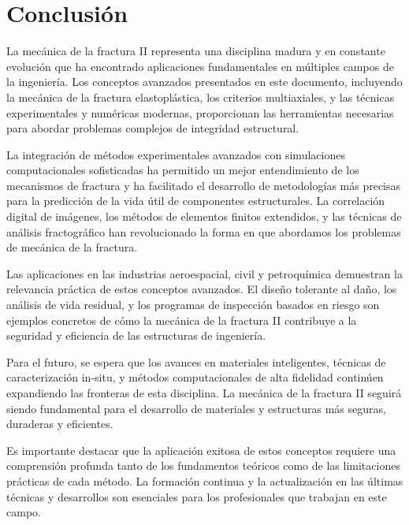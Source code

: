 \documentclass[12pt,letterpaper]{article}
\begin{document}
\section{Conclusión}

La mecánica de la fractura II representa una disciplina madura y en constante evolución que ha encontrado aplicaciones fundamentales en múltiples campos de la ingeniería. Los conceptos avanzados presentados en este documento, incluyendo la mecánica de la fractura elastoplástica, los criterios multiaxiales, y las técnicas experimentales y numéricas modernas, proporcionan las herramientas necesarias para abordar problemas complejos de integridad estructural.

La integración de métodos experimentales avanzados con simulaciones computacionales sofisticadas ha permitido un mejor entendimiento de los mecanismos de fractura y ha facilitado el desarrollo de metodologías más precisas para la predicción de la vida útil de componentes estructurales. La correlación digital de imágenes, los métodos de elementos finitos extendidos, y las técnicas de análisis fractográfico han revolucionado la forma en que abordamos los problemas de mecánica de la fractura.

Las aplicaciones en las industrias aeroespacial, civil y petroquímica demuestran la relevancia práctica de estos conceptos avanzados. El diseño tolerante al daño, los análisis de vida residual, y los programas de inspección basados en riesgo son ejemplos concretos de cómo la mecánica de la fractura II contribuye a la seguridad y eficiencia de las estructuras de ingeniería.

Para el futuro, se espera que los avances en materiales inteligentes, técnicas de caracterización in-situ, y métodos computacionales de alta fidelidad continúen expandiendo las fronteras de esta disciplina. La mecánica de la fractura II seguirá siendo fundamental para el desarrollo de materiales y estructuras más seguras, duraderas y eficientes.

Es importante destacar que la aplicación exitosa de estos conceptos requiere una comprensión profunda tanto de los fundamentos teóricos como de las limitaciones prácticas de cada método. La formación continua y la actualización en las últimas técnicas y desarrollos son esenciales para los profesionales que trabajan en este campo.

\newpage
\printbibliography
\end{document}
